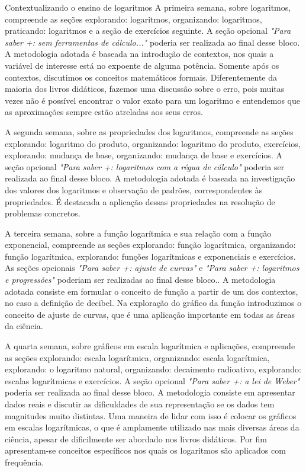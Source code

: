 \begin{apresentacao}{Contextualizando o ensino de logaritmos}
A primeira semana, sobre logaritmos, compreende as seções explorando: logaritmos, organizando: logaritmos, praticando: logaritmos e a seção de exercícios seguinte. A seção opcional \textit{"Para saber +: sem ferramentas de cálculo..."} poderia ser realizada ao final desse bloco. A metodologia adotada é baseada na introdução de contextos, nos quais a variável de interesse está no expoente de alguma potência. Somente após os contextos, discutimos os conceitos matemáticos formais. Diferentemente da maioria dos livros didáticos, fazemos uma discussão sobre o erro, pois muitas vezes não é possível encontrar o valor exato para um logaritmo e entendemos que as aproximações sempre estão atreladas aos seus erros.

A segunda semana, sobre as propriedades dos logaritmos, compreende as seções explorando: logaritmo do produto, organizando: logaritmo do produto, exercícios, explorando: mudança de base, organizando: mudança de base e exercícios. A seção opcional \textit{"Para saber +: logaritmos com a régua de cálculo"} poderia ser realizada ao final desse bloco. A metodologia adotada é baseada na investigação dos valores dos logaritmos e observação de padrões, correspondentes às propriedades. É destacada a aplicação dessas propriedades na resolução de problemas concretos.

A terceira semana, sobre a função logarítmica e sua relação com a função exponencial, compreende as seções explorando: função logarítmica, organizando: função logarítmica, explorando: funções logarítmicas e exponenciais e exercícios. As seções opcionais \textit{"Para saber +: ajuste de curvas"} e \textit{"Para saber +: logaritmos e progressões"} poderiam ser realizadas ao final desse bloco.. A metodologia adotada consiste em formular o conceito de função a partir de um dos contextos, no caso a definição de decibel. Na exploração do gráfico da função introduzimos o conceito de ajuste de curvas, que é uma aplicação importante em todas as áreas da ciência.

A quarta semana, sobre gráficos em escala logarítmica e aplicações, compreende as seções explorando: escala logarítmica, organizando: escala logarítmica, explorando: o logaritmo natural, organizando: decaimento radioativo, explorando: escalas logarítmicas e exercícios. A seção opcional \textit{"Para saber +: a lei de Weber"} poderia ser realizada ao final desse bloco. A metodologia consiste em apresentar dados reais e discutir as dificuldades de sua representação se os dados tem magnitudes muito distintas. Uma maneira de lidar com isso é colocar os gráficos em escalas logarítmicas, o que é amplamente utilizado nas mais diversas áreas da ciência, apesar de dificilmente ser abordado nos livros didáticos. Por fim apresentam-se conceitos específicos nos quais os logaritmos são aplicados com frequência.


\end{apresentacao}
